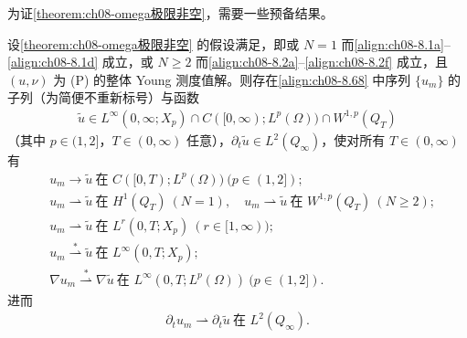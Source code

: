 \documentclass[../../main.tex]{subfiles}%
\begin{document}
为证\cref{theorem:ch08-omega极限非空}，需要一些预备结果。


\begin{lemma}\label{lemma:ch08-u_m收敛}
设\cref{theorem:ch08-omega极限非空} 的假设满足，即或 $N=1$ 而\eqref{align:ch08-8.1a}--\eqref{align:ch08-8.1d} 成立，或 $N\geqslant2$ 而\eqref{align:ch08-8.2a}--\eqref{align:ch08-8.2f} 成立，且 $(u,\nu)$ 为 (P) 的整体 Young 测度值解。则存在\eqref{align:ch08-8.68} 中序列 $\{u_m\}$ 的子列（为简便不重新标号）与函数
\begin{align*}
\tilde u\in L^\infty(0,\infty;X_p)\cap C([0,\infty);L^p(\Omega))\cap W^{1,p}(Q_T)
\end{align*}
（其中 $p\in(1,2]$，$T\in(0,\infty)$ 任意），$\partial_t\tilde u\in L^2(Q_\infty)$，使对所有 $T\in(0,\infty)$ 有
\begin{align}
&u_m\to\tilde u\ \text{在 }C([0,T);L^p(\Omega))\ (p\in(1,2]); \label{align:ch08-8.70a}\\
&u_m\rightharpoonup\tilde u\ \text{在 }H^1(Q_T)\ (N=1),\quad
u_m\rightharpoonup\tilde u\ \text{在 }W^{1,p}(Q_T)\ (N\geqslant2); \label{align:ch08-8.70b}\\
&u_m\rightharpoonup\tilde u\ \text{在 }L^r(0,T;X_p)\ (r\in[1,\infty)); \label{align:ch08-8.70c}\\
&u_m\stackrel{*}{\rightharpoonup}\tilde u\ \text{在 }L^\infty(0,T;X_p); \label{align:ch08-8.70d}\\
&\nabla u_m\stackrel{*}{\rightharpoonup}\nabla\tilde u\ \text{在 }L^\infty(0,T;L^p(\Omega))\ (p\in(1,2]). \label{align:ch08-8.70e}
\end{align}
进而
\begin{align}
\partial_t u_m\rightharpoonup\partial_t\tilde u\ \text{在 }L^2(Q_\infty). \label{align:ch08-8.70f}
\end{align}
\end{lemma}
\end{document}
